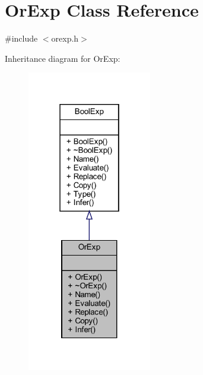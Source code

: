 \hypertarget{classOrExp}{}\section{Or\+Exp Class Reference}
\label{classOrExp}


{\ttfamily \#include $<$orexp.\+h$>$}



Inheritance diagram for Or\+Exp\+:
\nopagebreak
\begin{figure}[H]
\begin{center}
\leavevmode
\includegraphics[width=154pt]{classOrExp__inherit__graph}
\end{center}
\end{figure}


